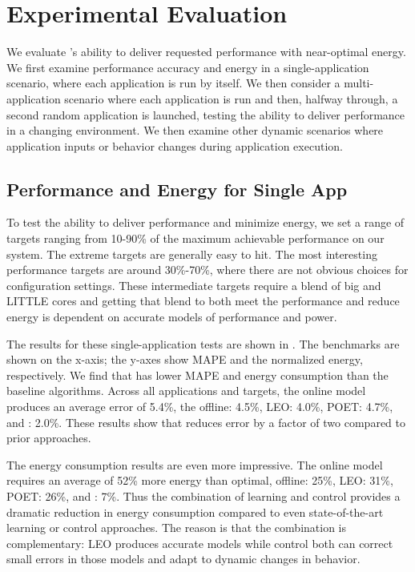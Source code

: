 \section{Experimental Evaluation}
We evaluate \SYSTEM{}'s ability to deliver requested performance with
near-optimal energy.  We first examine performance accuracy and energy
in a single-application scenario, where each application is run by
itself.  We then consider a multi-application scenario where each
application is run and then, halfway through, a second random
application is launched, testing the ability to deliver performance in
a changing environment.  We then examine other dynamic scenarios where
application inputs or behavior changes during application execution.

\subsection{Performance and Energy for Single App}
To test the ability to deliver performance and minimize energy, we set
a range of targets ranging from 10-90\% of the maximum achievable
performance on our system. The extreme targets are generally easy to
hit. The most interesting performance targets are around 30\%-70\%,
where there are not obvious choices for configuration settings. These
intermediate targets require a blend of big and LITTLE cores and
getting that blend to both meet the performance and reduce energy is
dependent on accurate models of performance and power.

The results for these single-application tests are shown in
.  The benchmarks are
shown on the x-axis; the y-axes show MAPE and the normalized energy,
respectively.  We find that \SYSTEM{} has lower MAPE and energy
consumption than the baseline algorithms. Across all applications and
targets, the online model produces an average error of 5.4\%, the
offline: 4.5\%, LEO: 4.0\%, POET: 4.7\%, and \SYSTEM{}: 2.0\%.  These
results show that \SYSTEM{} reduces error by a factor of two compared
to prior approaches.

The energy consumption results are even more impressive.  The online
model requires an average of 52\% more energy than optimal, offline:
25\%, LEO: 31\%, POET: 26\%, and \SYSTEM{}: 7\%.  Thus the combination
of learning and control provides a dramatic reduction in energy
consumption compared to even state-of-the-art learning or control
approaches.  The reason is that the combination is complementary: LEO
produces accurate models while control both can correct small errors
in those models and adapt to dynamic changes in behavior.

